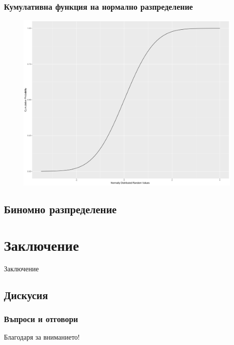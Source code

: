 \documentclass{beamer}
\begin{document}
\begin{frame}
\frametitle{Кумулативна функция на нормално разпределение}
\begin{figure}[]\includegraphics[width=\textwidth,height=0.75\textheight]{pic0052}\end{figure}
\end{frame}

\subsection{Биномно разпределение}

\begin{frame}
\frametitle{}
\begin{block}{}
\end{block}
\end{frame}

\section{Заключение}

\begin{frame}
\center \huge{Заключение}
\end{frame}

\subsection{Дискусия}

\begin{frame}
\frametitle{Въпроси и отговори}
\center \huge{Благодаря за вниманието!}
\end{frame}
\end{document}
